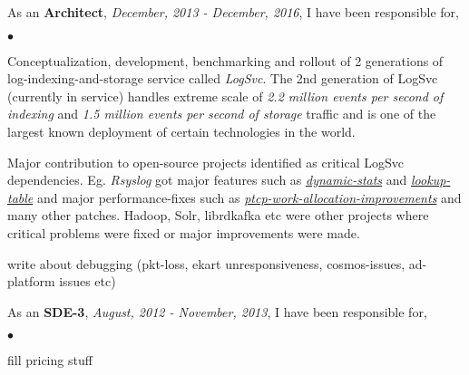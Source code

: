 \documentclass[margin,line]{res}
\newenvironment{list2}{
  \begin{list}{$\bullet$}{%
      \setlength{\itemsep}{0in}
      \setlength{\parsep}{0in} \setlength{\parskip}{0in}
      \setlength{\topsep}{0in} \setlength{\partopsep}{0in} 
      \setlength{\leftmargin}{0.2in}}}{\end{list}}
\begin{document}
\begin{resume}
As an {\bf Architect}, {\em December, 2013 - December, 2016}, I have been responsible for,\\
\begin{list2}
\item Conceptualization, development, benchmarking and rollout of 2 generations of log-indexing-and-storage service called {\em LogSvc}. The 2nd generation of LogSvc (currently in service) handles extreme scale of {\em 2.2 million events per second of indexing} and {\em 1.5 million events per second of storage} traffic and is one of the largest known deployment of certain technologies in the world.
\item Major contribution to open-source projects identified as critical LogSvc dependencies. Eg. {\em Rsyslog} got major features such as \href{https://github.com/rsyslog/rsyslog/pull/614}{\em dynamic-stats} and \href{https://github.com/rsyslog/rsyslog/pull/578}{\em lookup-table} and major performance-fixes such as \href{https://github.com/rsyslog/rsyslog/pull/567}{\em ptcp-work-allocation-improvements} and many other patches. Hadoop, Solr, librdkafka etc were other projects where critical problems were fixed or major improvements were made.
\item write about debugging (pkt-loss, ekart unresponsiveness, cosmos-issues, ad-platform issues etc)
\end{list2}

As an {\bf SDE-3}, {\em August, 2012 - November, 2013}, I have been responsible for,\\
\begin{list2}
\item fill pricing stuff
\end{list2}


\end{resume}
\end{document}
